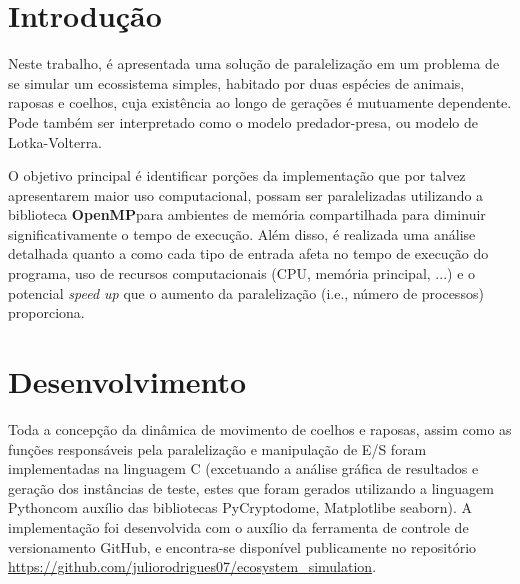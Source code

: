 \documentclass[a4paper, 12pt]{article}
\begin{document}
\newpage

\section{Introdução}

Neste trabalho, é apresentada uma solução de paralelização em um problema de se simular um ecossistema simples, habitado por duas espécies de animais, raposas e coelhos, cuja existência ao longo de gerações é mutuamente dependente. Pode também ser interpretado como o modelo predador-presa, ou modelo de Lotka-Volterra.

O objetivo principal é identificar porções da implementação que por talvez apresentarem maior uso computacional, possam ser paralelizadas utilizando a biblioteca \textbf{OpenMP}\footnotemark \hspace{0.1cm}para ambientes de memória compartilhada para diminuir significativamente o tempo de execução. Além disso, é realizada uma análise detalhada quanto a como cada tipo de entrada afeta no tempo de execução do programa, uso de recursos computacionais (CPU, memória principal, ...) e o potencial \emph{speed up} que o aumento da paralelização (i.e., número de processos) proporciona.


\section{Desenvolvimento}

Toda a concepção da dinâmica de movimento de coelhos e raposas, assim como as funções responsáveis pela paralelização e manipulação de E/S foram implementadas na linguagem C (excetuando a análise gráfica de resultados e geração dos instâncias de teste, estes que foram gerados utilizando a linguagem Python\footnotemark \hspace{0.1cm}com auxílio das bibliotecas PyCryptodome\footnotemark, Matplotlib\footnotemark \hspace{0.1cm}e seaborn\footnotemark). A implementação foi desenvolvida com o auxílio da ferramenta de controle de versionamento GitHub\footnotemark, e encontra-se disponível publicamente no repositório \url{https://github.com/juliorodrigues07/ecosystem_simulation}.

\end{document}
